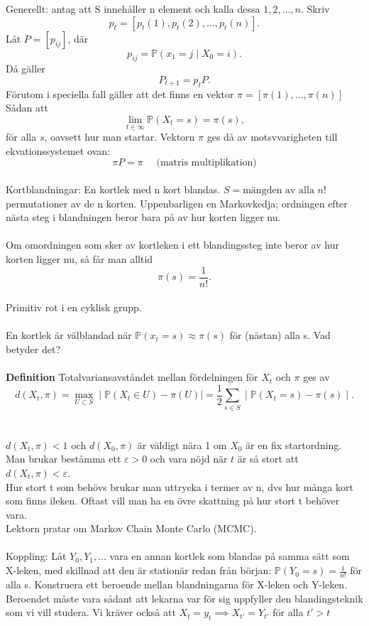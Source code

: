 Generellt: antag att S innehåller n element och kalla dessa $1,2,\ldots,n$. Skriv $$p_t=[p_t(1),p_t(2),\ldots,p_t(n)].$$
Låt $P=[p_{ij}]$, där $$p_{ij}=\mathbb{P}(x_1=j\mid X_0=i).$$
Då gäller $$P_{t+1}=p_tP.$$
Förutom i speciella fall gäller att det finns en vektor
$\pi=[\pi(1),\ldots,\pi(n)]$ Sådan att$$\lim\limits_{t\in \infty}\mathbb{P}(X_t=s)=\pi(s),$$
för alla $s$, oavsett hur man startar. Vektorn $\pi$ ges då av motsvvarigheten till ekvationssystemet ovan:
$$\pi P=\pi\quad\text{ (matris multiplikation)}$$\\
Kortblandningar: En kortlek med n kort blandas. $S=\text{mängden av alla }n!$ permutationer av de n korten. Uppenbarligen en Markovkedja; ordningen efter nästa steg i blandningen beror bara på av hur korten ligger nu.\\\\
Om omordningen som sker av kortleken i ett blandingssteg inte beror av hur korten ligger nu, så får man alltid $$\pi(s)=\frac{1}{n!}.$$\\
Primitiv rot i en cyklisk grupp.\\\\
En kortlek är välblandad när $\mathbb{P}(x_t=s)\approx\pi(s)$ för (nästan) alla s. Vad betyder det?\\\\
\textbf{Definition} Totalvariansavståndet mellan fördelningen för $X_t$ och $\pi$ ges av $$d(X_t,\pi)=\max_{U\subset S}\mid \mathbb{P}(X_t \in U)-\pi(U)\mid=\frac{1}{2}\sum_{s\in S}\mid\mathbb{P}(X_t=s)-\pi(s)\mid.$$\\\\
$d(X_t,\pi)<1$ och $d(X_0,\pi)$ är väldigt nära 1 om $X_0$ är en fix startordning. Man brukar beståmma ett $\varepsilon>0$ och vara nöjd när $t$ är så stort att $d(X_t,\pi)<\varepsilon$.\\
Hur stort t som behövs brukar man uttrycka i termer av n, dvs hur många kort som finns ileken. Oftast vill man ha en övre skattning på hur stort t behöver vara.\\
Lektorn pratar om Markov Chain Monte Carlo (MCMC).\\\\
Koppling: Låt $Y_0,Y_1,\ldots$ vara en annan kortlek som blandas på samma sätt som X-leken, med skillnad att den är stationär redan från början: $\mathbb{P}(Y_0=s)=\frac{1}{n!}$ för alla s. Konstruera ett beroende mellan blandningarna för X-leken och Y-leken. Beroendet måste vara sådant att lekarna var för sig uppfyller den blandingsteknik som vi vill studera. Vi kräver också att $X_t=y_t \implies X_{t'}=Y_{t'}$ för alla $t'>t$\\
